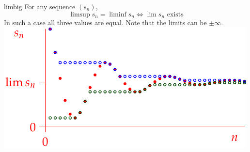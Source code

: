 \begin{thm}[lower separated=false, sidebyside, sidebyside align=top seam, sidebyside gap=0pt, righthand width=0.48\linewidth]{}{limbig}
	For any sequence $(s_n)$,
	\[
		\limsup s_n=\liminf s_n \iff\lim s_n\text{ exists}
	\]
	In such a case all three values are equal.\smallbreak
	Note that the limits can be $\pm\infty$.
	\tcblower
	\hfill\includegraphics[scale=0.8]{limsup1}
\end{thm}




